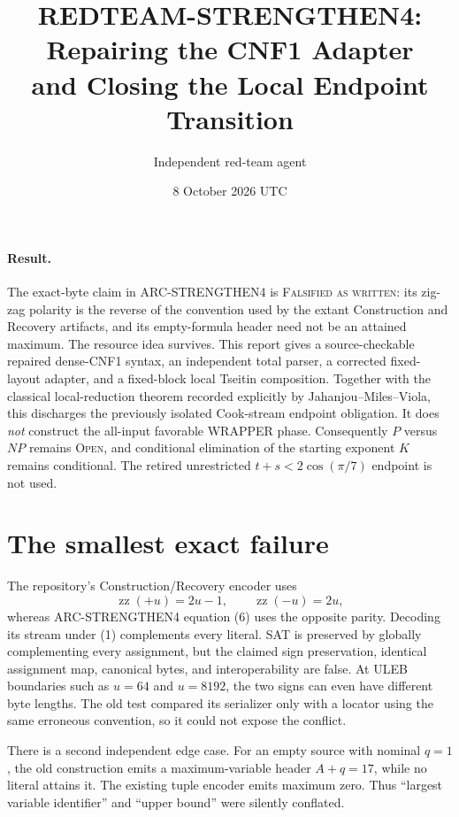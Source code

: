 \documentclass[11pt]{article}
\title{REDTEAM-STRENGTHEN4: Repairing the CNF1 Adapter\\and Closing the Local Endpoint Transition}
\author{Independent red-team agent}
\date{8 October 2026 UTC}
\begin{document}
\sloppy\maketitle

\paragraph{Result.}
The exact-byte claim in ARC-STRENGTHEN4 is \textsc{Falsified as written}:
its zig-zag polarity is the reverse of the convention used by the extant
Construction and Recovery artifacts, and its empty-formula header need not be
an attained maximum.  The resource idea survives.  This report gives a
source-checkable repaired dense-CNF1 syntax, an independent total parser, a
corrected fixed-layout adapter, and a fixed-block local Tseitin composition.
Together with the classical local-reduction theorem recorded explicitly by
Jahanjou--Miles--Viola, this discharges the previously isolated Cook-stream
endpoint obligation.  It does \emph{not} construct the all-input favorable
WRAPPER phase.  Consequently $P$ versus $NP$ remains \textsc{Open}, and
conditional elimination of the starting exponent $K$ remains conditional.
The retired unrestricted $t+s<2\cos(\pi/7)$ endpoint is not used.

\section{The smallest exact failure}

The repository's Construction/Recovery encoder uses
\[
 \operatorname{zz}(+u)=2u-1,\qquad
 \operatorname{zz}(-u)=2u,                                 \tag{1}
\]
whereas ARC-STRENGTHEN4 equation (6) uses the opposite parity.  Decoding its
stream under (1) complements every literal.  SAT is preserved by globally
complementing every assignment, but the claimed sign preservation, identical
assignment map, canonical bytes, and interoperability are false.  At ULEB
boundaries such as $u=64$ and $u=8192$, the two signs can even have different
byte lengths.  The old test compared its serializer only with a locator using
the same erroneous convention, so it could not expose the conflict.

There is a second independent edge case.  For an empty source with nominal
$q=1$, the old construction emits a maximum-variable header $A+q=17$, while
no literal attains it.  The existing tuple encoder emits maximum zero.  Thus
``largest variable identifier'' and ``upper bound'' were silently conflated.
\end{document}
